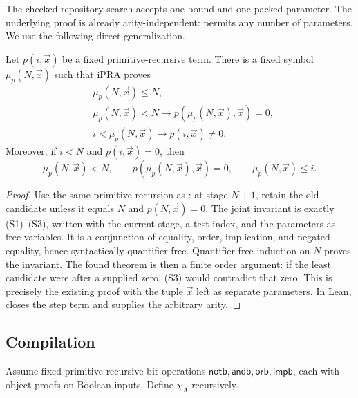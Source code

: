The checked repository search accepts one bound and one packed parameter.  The
underlying proof is already arity-independent:  permits any
number of parameters.  We use the following direct generalization.

\begin{theorem}
\label{thm:searchN}
Let \(p(i,\vec x)\) be a fixed primitive-recursive term.  There is a fixed
symbol \(\mu_p(N,\vec x)\) such that iPRA proves
\begin{align*}
 &\mu_p(N,\vec x)\le N,\tag{S1}\\
 &\mu_p(N,\vec x)<N
      \longrightarrow p(\mu_p(N,\vec x),\vec x)=0,\tag{S2}\\
 &i<\mu_p(N,\vec x)
      \longrightarrow p(i,\vec x)\neq0.\tag{S3}
\end{align*}
Moreover, if \(i<N\) and \(p(i,\vec x)=0\), then
\[
  \mu_p(N,\vec x)<N,\qquad
  p(\mu_p(N,\vec x),\vec x)=0,
  \qquad
  \mu_p(N,\vec x)\le i.
\]
\end{theorem}

\begin{proof}
Use the same primitive recursion as : at stage \(N+1\),
retain the old candidate unless it equals \(N\) and \(p(N,\vec x)=0\).  The
joint invariant is exactly (S1)--(S3), written with the current stage, a test
index, and the parameters as free variables.  It is a conjunction of equality,
order, implication, and negated equality, hence syntactically quantifier-free.
Quantifier-free induction on \(N\) proves the invariant.  The found theorem is
then a finite order argument: if the least candidate were after a supplied
zero, (S3) would contradict that zero.  This is precisely the existing proof
with the tuple \(\vec x\) left as separate parameters.  In Lean,
 closes the step term and  supplies the arbitrary
arity.
\end{proof}

\subsection{Compilation}

Assume fixed primitive-recursive bit operations
\(\mathsf{notb},\mathsf{andb},\mathsf{orb},\mathsf{impb}\), each with object
proofs on Boolean inputs.  Define \(\chi_A\) recursively.


